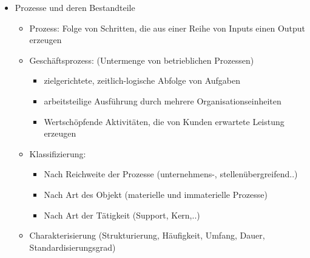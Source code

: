 \documentclass[11pt,a4paper]{article}
\begin{document}
\begin{itemize}
\begin{itemize}
	\end{itemize}
	\vspace{0.3cm}

\item Prozesse und deren Bestandteile
	\begin{itemize}
	\item Prozess: Folge von Schritten, die aus einer Reihe von Inputs einen Output erzeugen
	\item Geschäftsprozess: (Untermenge von betrieblichen Prozessen) 
		\begin{itemize}
		\item zielgerichtete, zeitlich-logische Abfolge von Aufgaben
		\item arbeitsteilige Ausführung durch mehrere Organisationseinheiten
		\item Wertschöpfende Aktivitäten, die von Kunden erwartete Leistung erzeugen
		\end{itemize}
	\item Klassifizierung:
		\begin{itemize}
		\item Nach Reichweite der Prozesse (unternehmens-, stellenübergreifend..)
		\item Nach Art des Objekt (materielle und immaterielle Prozesse)
		\item Nach Art der Tätigkeit (Support, Kern,..)
		\end{itemize}
	\item Charakterisierung (Strukturierung, Häufigkeit, Umfang, Dauer, Standardisierungsgrad)
	\end{itemize}


\end{itemize}
\end{document}
